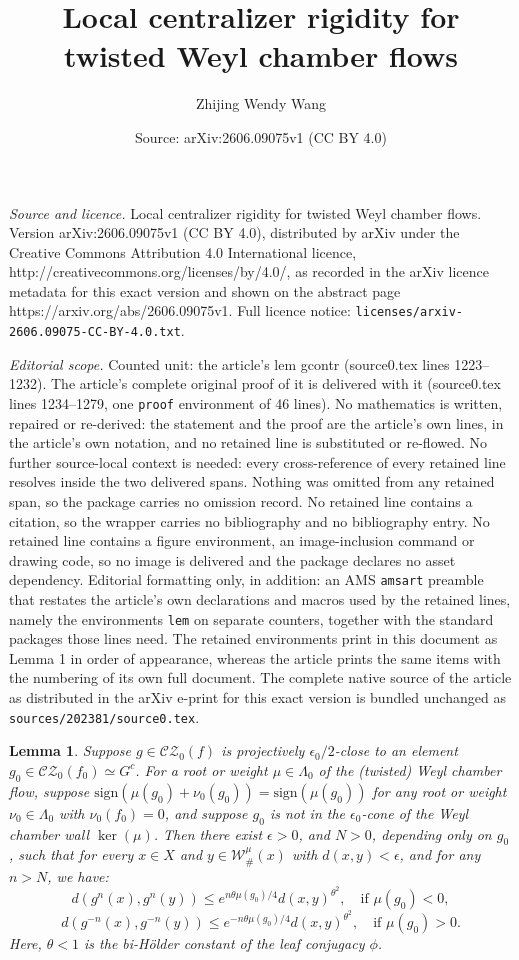\documentclass[10pt,a4paper]{amsart}
\title{Local centralizer rigidity for twisted Weyl chamber flows}
\author{Zhijing Wendy Wang}
\date{Source: arXiv:2606.09075v1 (CC BY 4.0)}
\newtheorem{lem}{Lemma}
\newcommand{\CZ}{\mathcal{CZ}}
\newcommand{\W}{\mathcal{W}}
\begin{document}
\maketitle

\noindent\emph{Source and licence.} Local centralizer rigidity for twisted Weyl chamber flows. Version arXiv:2606.09075v1 (CC BY 4.0), distributed by arXiv under the Creative Commons Attribution 4.0 International licence, http://creativecommons.org/licenses/by/4.0/, as recorded in the arXiv licence metadata for this exact version and shown on the abstract page https://arxiv.org/abs/2606.09075v1. Full licence notice: \texttt{licenses/arxiv-2606.09075-CC-BY-4.0.txt}.\par\smallskip

\noindent\textit{Editorial scope.} Counted unit: the article's lem gcontr (source0.tex lines 1223--1232). The article's complete original proof of it is delivered with it (source0.tex lines 1234--1279, one \texttt{proof} environment of 46 lines). No mathematics is written, repaired or re-derived: the statement and the proof are the article's own lines, in the article's own notation, and no retained line is substituted or re-flowed.  No further source-local context is needed: every cross-reference of every retained line resolves inside the two delivered spans.  Nothing was omitted from any retained span, so the package carries no omission record.  No retained line contains a citation, so the wrapper carries no bibliography and no bibliography entry.  No retained line contains a figure environment, an image-inclusion command or drawing code, so no image is delivered and the package declares no asset dependency.  Editorial formatting only, in addition: an AMS \texttt{amsart} preamble that restates the article's own declarations and macros used by the retained lines, namely the environments \texttt{lem} on separate counters, together with the standard packages those lines need.  The retained environments print in this document as Lemma 1 in order of appearance, whereas the article prints the same items with the numbering of its own full document.  The complete native source of the article as distributed in the arXiv e-print for this exact version is bundled unchanged as \texttt{sources/202381/source0.tex}.
\begin{lem}\label{gcontr}
    Suppose $g \in \CZ_0(f)$ is projectively $\epsilon_0/2$-close to an element $g_0 \in \CZ_0(f_0) \simeq G^c$. For a root or weight $\mu\in \Lambda_0$ of the (twisted) Weyl chamber flow, suppose $\mathrm{sign}(\mu(g_0) + \nu_0(g_0)) = \mathrm{sign}(\mu(g_0))$ for any root or weight $\nu_0\in \Lambda_0$ with $\nu_0(f_0) = 0$, and suppose $g_0$ is not in the $\epsilon_0$-cone of the Weyl chamber wall $\ker(\mu)$. Then there exist $\epsilon > 0$, and $N > 0$, depending only on $g_0$, such that for every $x \in X$ and $y \in \W^\mu_\#(x)$ with $d(x,y) < \epsilon$, and for any $n > N$, we have:
    \[
    d(g^n(x), g^n(y)) \le e^{n \theta \mu(g_0)/4} d(x,y)^{\theta^2}, \quad \text{if } \mu(g_0) < 0,
    \]
    \[
    d(g^{-n}(x), g^{-n}(y)) \le e^{-n \theta \mu(g_0)/4} d(x,y)^{\theta^2}, \quad \text{if } \mu(g_0) > 0.
    \]
    Here, $\theta < 1$ is the bi-Hölder constant of the leaf conjugacy $\phi$.
\end{lem}
\end{document}
